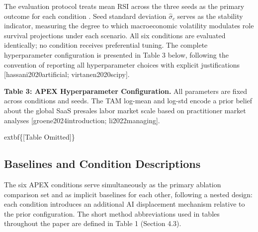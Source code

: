\documentclass[10pt, conference]{IEEEtran}
\begin{document}
The evaluation protocol treats mean RSI across the three seeds as the primary outcome for each condition \cite{wiser2021expert}. Seed standard deviation $\hat{\sigma}_c$ serves as the stability indicator, measuring the degree to which macroeconomic volatility modulates role survival projections under each scenario. All six conditions are evaluated identically; no condition receives preferential tuning. The complete hyperparameter configuration is presented in Table 3 below, following the convention of reporting all hyperparameter choices with explicit justifications [hassani2020artificial; virtanen2020scipy].

\textbf{Table 3: APEX Hyperparameter Configuration.} All parameters are fixed across conditions and seeds. The TAM log-mean and log-std encode a prior belief about the global SaaS presales labor market scale based on practitioner market analyses [groene2024introduction; li2022managing].

	extbf\{[Table Omitted]\}

\subsection{Baselines and Condition Descriptions}

\label{sec:baselines_and_condition_descriptions}

The six APEX conditions serve simultaneously as the primary ablation comparison set and as implicit baselines for each other, following a nested design: each condition introduces an additional AI displacement mechanism relative to the prior configuration. The short method abbreviations used in tables throughout the paper are defined in Table 1 (Section 4.3).
\end{document}
